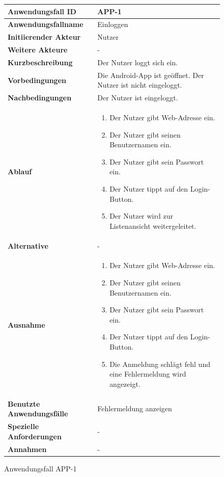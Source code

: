 \newpage

\begin{figure}[h]
	\centering
	\begin{tabularx}{\textwidth}{ X | X }
		\textbf{Anwendungsfall ID} & APP-1 \\ \hline
		\textbf{Anwendungsfallname} & Einloggen \\ \hline
		\textbf{Initiierender Akteur} & Nutzer \\ \hline
		\textbf{Weitere Akteure} & -  \\ \hline
		\textbf{Kurzbeschreibung} & Der Nutzer loggt sich ein.  \\ \hline
		\textbf{Vorbedingungen} & Die Android-App ist geöffnet. Der Nutzer ist nicht eingeloggt.  \\ \hline
		\textbf{Nachbedingungen} & Der Nutzer ist eingeloggt.  \\ \hline
		\textbf{Ablauf} &
			\begin{enumerate}
				\item Der Nutzer gibt Web-Adresse ein.
				\item Der Nutzer gibt seinen Benutzernamen ein.
				\item Der Nutzer gibt sein Passwort ein.
				\item Der Nutzer tippt auf den Login-Button.
				\item Der Nutzer wird zur Listenansicht weitergeleitet.
			\end{enumerate} \\ \hline
		\textbf{Alternative} &
				- \\ \hline
		\textbf{Ausnahme} &
				\begin{enumerate}
					\item Der Nutzer gibt Web-Adresse ein.
					\item Der Nutzer gibt seinen Benutzernamen ein.
					\item Der Nutzer gibt sein Passwort ein.
					\item Der Nutzer tippt auf den Login-Button.
					\item Die Anmeldung schlägt fehl und eine Fehlermeldung wird angezeigt.
				\end{enumerate}  \\ \hline
		\textbf{Benutzte Anwendungsfälle} & Fehlermeldung anzeigen \\ \hline
		\textbf{Spezielle Anforderungen} & - \\ \hline
		\textbf{Annahmen} & -
	\end{tabularx}
	\caption{Anwendungsfall APP-1}
	\label{fig:anwendungsfall-app-tabelle-APP-1}
\end{figure}


